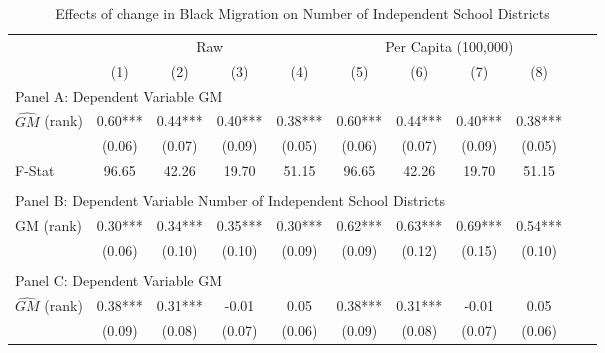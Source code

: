  \begin{table}[htbp]\centering {} \begin{threeparttable} \caption{Effects of change in Black Migration on Number of Independent School Districts} \begin{tabular}{l*{10}{c}} \toprule
                &\multicolumn{4}{c}{Raw}                                    &\multicolumn{4}{c}{Per Capita (100,000)}                   \\\cmidrule(lr){2-5}\cmidrule(lr){6-9}
                &\multicolumn{1}{c}{(1)}   &\multicolumn{1}{c}{(2)}   &\multicolumn{1}{c}{(3)}   &\multicolumn{1}{c}{(4)}   &\multicolumn{1}{c}{(5)}   &\multicolumn{1}{c}{(6)}   &\multicolumn{1}{c}{(7)}   &\multicolumn{1}{c}{(8)}   \\
\cmidrule(lr){1-9}
\multicolumn{8}{l}{Panel A: Dependent Variable GM}\\
\cmidrule(lr){1-9}
$\hat{GM}$ (rank)&       0.60***&       0.44***&       0.40***&       0.38***&       0.60***&       0.44***&       0.40***&       0.38***\\
                &     (0.06)   &     (0.07)   &     (0.09)   &     (0.05)   &     (0.06)   &     (0.07)   &     (0.09)   &     (0.05)   \\
\midrule
F-Stat          &      96.65   &      42.26   &      19.70   &      51.15   &      96.65   &      42.26   &      19.70   &      51.15   \\
\cmidrule[\heavyrulewidth](lr){1-9} \\ \cmidrule[\heavyrulewidth](lr){1-9}
\multicolumn{8}{l}{Panel B: Dependent Variable Number of Independent School Districts}\\
\cmidrule(lr){1-9}
GM  (rank)      &       0.30***&       0.34***&       0.35***&       0.30***&       0.62***&       0.63***&       0.69***&       0.54***\\
                &     (0.06)   &     (0.10)   &     (0.10)   &     (0.09)   &     (0.09)   &     (0.12)   &     (0.15)   &     (0.10)   \\
\cmidrule[\heavyrulewidth](lr){1-9} \\ \cmidrule[\heavyrulewidth](lr){1-9}
\multicolumn{8}{l}{Panel C: Dependent Variable GM}\\
\cmidrule(lr){1-9}
$\hat{GM}$ (rank)&       0.38***&       0.31***&      -0.01   &       0.05   &       0.38***&       0.31***&      -0.01   &       0.05   \\
                &     (0.09)   &     (0.08)   &     (0.07)   &     (0.06)   &     (0.09)   &     (0.08)   &     (0.07)   &     (0.06)   \\

\end{tabular}
\end{threeparttable}
\end{table}

